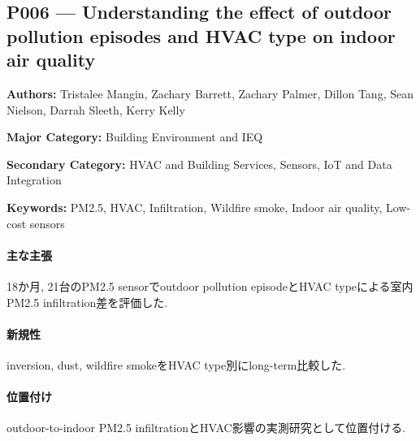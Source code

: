 \subsection{P006 --- Understanding the effect of outdoor pollution episodes and HVAC type on indoor air quality}
\label{paper:P006}
\textbf{Authors:} Tristalee Mangin, Zachary Barrett, Zachary Palmer, Dillon Tang, Sean Nielson, Darrah Sleeth, Kerry Kelly\par
\textbf{Major Category:} Building Environment and IEQ\par
\textbf{Secondary Category:} HVAC and Building Services, Sensors, IoT and Data Integration\par
\textbf{Keywords:} PM2.5, HVAC, Infiltration, Wildfire smoke, Indoor air quality, Low-cost sensors\par
\paragraph{主な主張}
18か月, 21台のPM2.5 sensorでoutdoor pollution episodeとHVAC typeによる室内PM2.5 infiltration差を評価した. \cite{Mangin:2025OutdoorPM25}
\paragraph{新規性}
inversion, dust, wildfire smokeをHVAC type別にlong-term比較した.
\paragraph{位置付け}
outdoor-to-indoor PM2.5 infiltrationとHVAC影響の実測研究として位置付ける.
